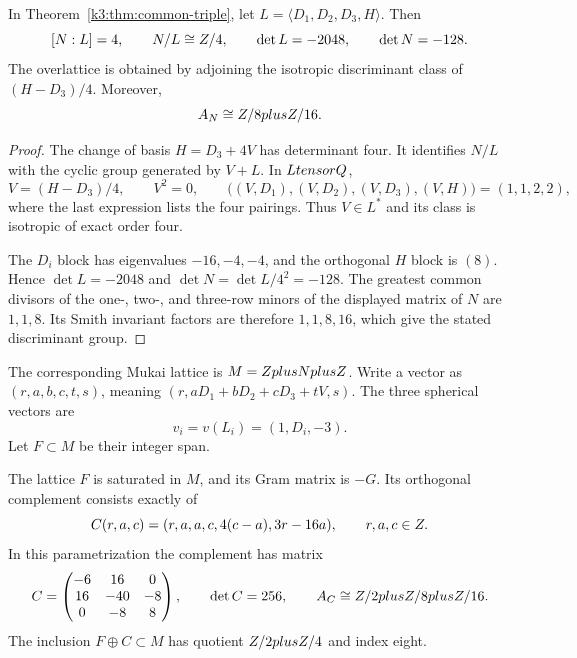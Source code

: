 \begin{proposition}
\label{k3:prop:picard-gluing}
In Theorem~\ref{k3:thm:common-triple}, let
$L=\langle D_1,D_2,D_3,H\rangle$.  Then
\[
[N:L]=4,\qquad N/L\cong Z/4,
\qquad \det L=-2048,\qquad \det N=-128.
\]
The overlattice is obtained by adjoining the isotropic discriminant
class of $(H-D_3)/4$.  Moreover,
\[
A_N\cong Z/8plusZ/16.
\]
\end{proposition}

\begin{proof}
The change of basis $H=D_3+4V$ has determinant four.  It identifies
$N/L$ with the cyclic group generated by $V+L$.  In $LtensorQ$,
\[
V=(H-D_3)/4,\qquad V^2=0,
\qquad \bigl((V,D_1),(V,D_2),(V,D_3),(V,H)\bigr)=(1,1,2,2),
\]
where the last expression lists the four pairings.  Thus $V\in L^*$
and its class is isotropic of exact order four.

The $D_i$ block has eigenvalues $-16,-4,-4$, and the orthogonal
$H$ block is $(8)$.  Hence $\det L=-2048$ and
$\det N=\det L/4^2=-128$.  The greatest common divisors of the
one-, two-, and three-row minors of the displayed matrix of $N$ are
$1,1,8$.  Its Smith invariant factors are therefore $1,1,8,16$,
which give the stated discriminant group.
\end{proof}

The corresponding Mukai lattice is
$M=Zplus NplusZ$.  Write a vector as
$(r,a,b,c,t,s)$, meaning $(r,aD_1+bD_2+cD_3+tV,s)$.  The three
spherical vectors are
\[
v_i=v(L_i)=(1,D_i,-3).
\]
Let $F\subset M$ be their integer span.

\begin{proposition}
\label{k3:prop:spherical-complement}
The lattice $F$ is saturated in $M$, and its Gram matrix is $-G$.
Its orthogonal complement consists exactly of
\[
C(r,a,c)=(r,a,a,c,4(c-a),3r-16a),\qquad r,a,c\in Z.
\]
In this parametrization the complement has matrix
\[
C=\begin{pmatrix}-6&16&0\\16&-40&-8\\0&-8&8\end{pmatrix},
\qquad \det C=256,
\qquad A_C\cong Z/2plusZ/8plusZ/16.
\]
The inclusion $F\oplus C\subset M$ has quotient
$Z/2plusZ/4$ and index eight.
\end{proposition}

